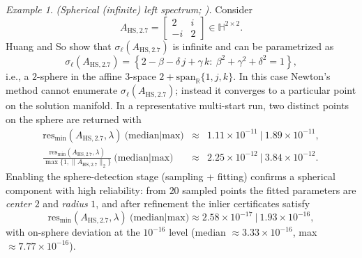 \documentclass[preprint,12pt]{elsarticle}  %
\theoremstyle{definition}
\theoremstyle{definition}
\theoremstyle{definition}
\theoremstyle{definition}
\theoremstyle{definition}
\theoremstyle{remark}
\theoremstyle{remark}
\newtheorem{Ex}{Example}
\theoremstyle{remark}
\DeclareRobustCommand{\i}{\ensuremath{\mathbf{i}}}
\DeclareRobustCommand{\j}{\ensuremath{\mathbf{j}}}
\DeclareRobustCommand{\k}{\ensuremath{\mathbf{k}}}
\def\i{i}\def\j{j}\def\k{k}%
\newcommand{\RR}{\mathbb{R}}
\newcommand{\HH}{\mathbb{H}}
\begin{document}
\begin{Ex}\label{ex:HS_27}
\emph{(Spherical (infinite) left spectrum; \cite[Ex.~2.7]{HuangSo2001}).}
Consider
\[
A_{\mathrm{HS},2.7}=
\begin{bmatrix}
2 & \i\\
-\i & 2
\end{bmatrix}\in\HH^{2\times2}.
\]
Huang and So show that $\sigma_\ell(A_{\mathrm{HS},2.7})$ is infinite and can be parametrized as
\[
\sigma_\ell(A_{\mathrm{HS},2.7})
=\left\{
2-\beta-\delta\,\j+\gamma\,\k:\ \beta^2+\gamma^2+\delta^2=1
\right\},
\]
i.e., a $2$-sphere in the affine $3$-space $2+\mathrm{span}_\RR\{1,\j,\k\}$.
In this case Newton's method cannot enumerate $\sigma_\ell(A_{\mathrm{HS},2.7})$; instead it converges to a particular
point on the solution manifold.
In a representative multi-start run, two distinct points on the sphere are returned with
\[
\begin{array}{rcl}
\mathrm{res}_{\min}(A_{\mathrm{HS},2.7},\lambda)\ \text{(median|max)}
&\approx& 1.11\times10^{-11}\ \big|\ 1.89\times10^{-11},
\\[2mm]
\frac{\mathrm{res}_{\min}(A_{\mathrm{HS},2.7},\lambda)}{\max\{1,\|A_{\mathrm{HS},2.7}\|_2\}}\ \text{(median|max)}
&\approx& 2.25\times10^{-12}\ \big|\ 3.84\times10^{-12}.
\end{array}
\]
Enabling the sphere-detection stage (sampling + fitting) confirms a spherical component with high reliability:
from $20$ sampled points the fitted parameters are \emph{center} $2$ and \emph{radius} $1$, and after refinement the inlier
certificates satisfy
\[
\mathrm{res}_{\min}(A_{\mathrm{HS},2.7},\lambda)\ \text{(median|max)}
\approx 2.58\times10^{-17}\ \big|\ 1.93\times10^{-16},
\]
with on-sphere deviation at the $10^{-16}$ level (median $\approx 3.33\times10^{-16}$, max  $\approx 7.77\times10^{-16}$).
\end{Ex}

\end{document}
